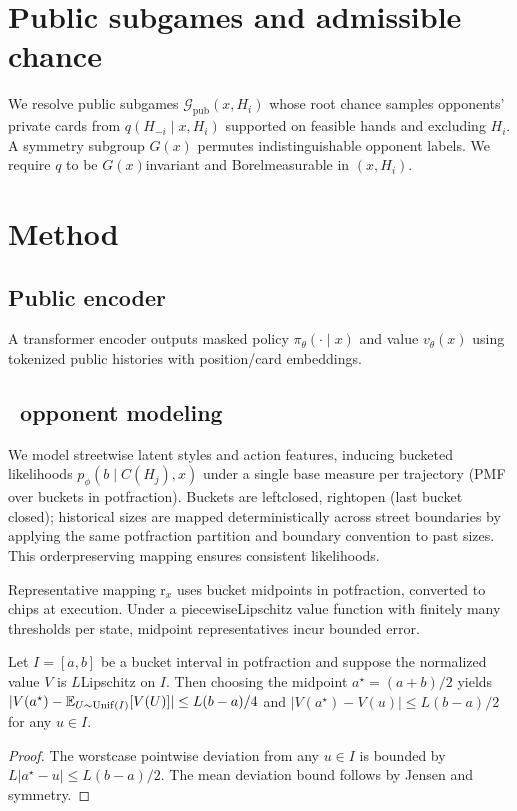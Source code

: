 \section{Public subgames and admissible chance}
We re\textendash solve public subgames $\mathcal{G}_{\text{pub}}(x,H_i)$ whose root chance samples opponents’ private cards from $q(H_{-i}\mid x,H_i)$ supported on feasible hands and excluding $H_i$. A symmetry subgroup $G(x)$ permutes indistinguishable opponent labels. We require $q$ to be $G(x)$\textendash invariant and Borel\textendash measurable in $(x,H_i)$.

\section{Method}
\subsection{Public encoder}
A transformer encoder outputs masked policy $\pi_\theta(\cdot\mid x)$ and value $v_\theta(x)$ using tokenized public histories with position/card embeddings.

\subsection{\sCRF\ opponent modeling}
We model streetwise latent styles and action features, inducing bucketed likelihoods $p_\phi(b\mid C(H_j),x)$ under a single base measure per trajectory (PMF over buckets in pot\textendash fraction). Buckets are left\textendash closed, right\textendash open (last bucket closed); historical sizes are mapped deterministically across street boundaries by applying the same pot\textendash fraction partition and boundary convention to past sizes. This order\textendash preserving mapping ensures consistent likelihoods.

Representative mapping r$_x$ uses bucket midpoints in pot\textendash fraction, converted to chips at execution. Under a piecewise\textendash Lipschitz value function with finitely many thresholds per state, midpoint representatives incur bounded error.

\begin{lemma}
Let $I=[a,b]$ be a bucket interval in pot\textendash fraction and suppose the normalized value $V$ is $L$\textendash Lipschitz on $I$. Then choosing the midpoint $a^\star=(a+b)/2$ yields $|V(a^\star)-\mathbb{E}_{U\sim\mathrm{Unif}(I)}[V(U)]|\le L(b-a)/4$ and $|V(a^\star)-V(u)|\le L(b-a)/2$ for any $u\in I$.
\end{lemma}
\begin{proof}
The worst\textendash case pointwise deviation from any $u\in I$ is bounded by $L|a^\star-u|\le L(b-a)/2$. The mean deviation bound follows by Jensen and symmetry.
\end{proof}

